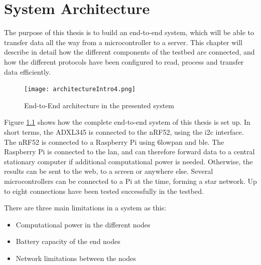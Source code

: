 \chapter{System Architecture}
\label{chp:architecture} 

\noindent The purpose of this thesis is to build an end-to-end system, which will be able to transfer data all the way from a \gls{microcontroller} to a server. This chapter will describe in detail how the different components of the testbed are connected, and how the different protocols have been configured to read, process and transfer data efficiently. 

\begin{figure}[ht]
    \centering
    \texttt{[image: architectureIntro4.png]}    
    \caption{End-to-End architecture in the presented system}
    \label{fig:systemArchitectureThisSystem}
\end{figure}


\noindent Figure \ref{fig:systemArchitectureThisSystem} shows how the complete end-to-end system of this thesis is set up. In short terms, the \gls{ADXL345} is connected to the \gls{nRF52}, using the \gls{i2c} interface. The \gls{nRF52} is connected to a  \gls{Raspberry Pi} using \gls{6lowpan} and \gls{ble}. The \gls{Raspberry Pi} is connected to the \gls{lan}, and can therefore forward data to a central stationary computer if additional computational power is needed. Otherwise, the results can be sent to the web, to a screen or anywhere else. Several \glspl{microcontroller} can be connected to a Pi at the time, forming a star network. Up to eight connections have been tested successfully in the testbed. 

\noindent There are three main limitations in a system as this:

\begin{itemize}
  \item Computational power in the different nodes
  \item Battery capacity of the end nodes
  \item Network limitations between the nodes
\end{itemize}




